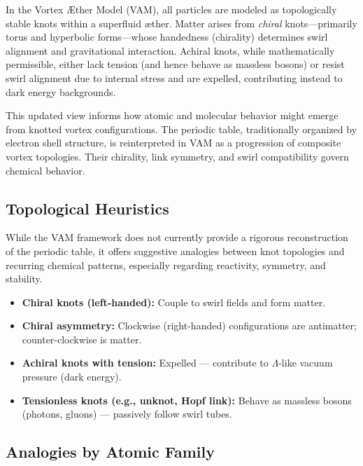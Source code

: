 \documentclass[a4paper,12pt]{article}
\begin{document}
In the Vortex Æther Model (VAM), all particles are modeled as topologically stable knots within a superfluid æther. Matter arises from \emph{chiral} knots—primarily torus and hyperbolic forms—whose handedness (chirality) determines swirl alignment and gravitational interaction. Achiral knots, while mathematically permissible, either lack tension (and hence behave as massless bosons) or resist swirl alignment due to internal stress and are expelled, contributing instead to dark energy backgrounds.

This updated view informs how atomic and molecular behavior might emerge from knotted vortex configurations. The periodic table, traditionally organized by electron shell structure, is reinterpreted in VAM as a progression of composite vortex topologies. Their chirality, link symmetry, and swirl compatibility govern chemical behavior.

\subsection*{Topological Heuristics}

While the VAM framework does not currently provide a rigorous reconstruction of the periodic table, it offers suggestive analogies between knot topologies and recurring chemical patterns, especially regarding reactivity, symmetry, and stability.

\begin{itemize}
    \item \textbf{Chiral knots (left-handed):} Couple to swirl fields and form matter.
    \item \textbf{Chiral asymmetry:} Clockwise (right-handed) configurations are antimatter; counter-clockwise is matter.
    \item \textbf{Achiral knots with tension:} Expelled — contribute to $\Lambda$-like vacuum pressure (dark energy).
    \item \textbf{Tensionless knots (e.g., unknot, Hopf link):} Behave as massless bosons (photons, gluons) — passively follow swirl tubes.
\end{itemize}

\subsection*{Analogies by Atomic Family}
\end{document}
